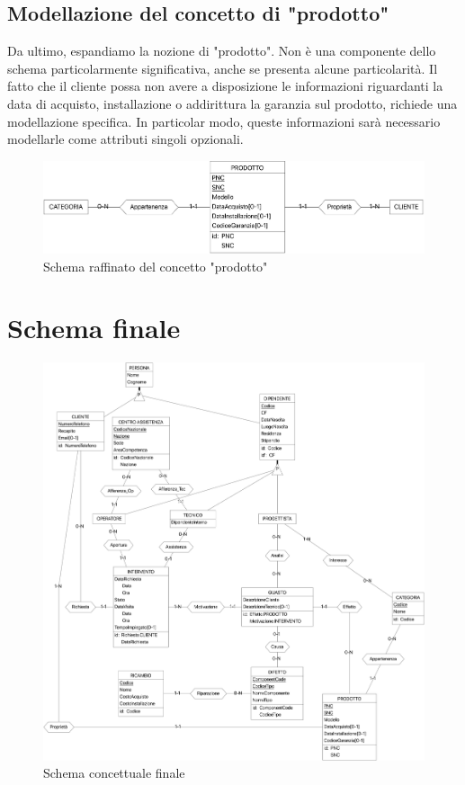 \documentclass[a4paper, 12pt]{report}
\begin{document}
\subsection{Modellazione del concetto di "prodotto"}

Da ultimo, espandiamo la nozione di "prodotto". Non è una componente dello schema particolarmente significativa, anche se presenta alcune particolarità.
Il fatto che il cliente possa non avere a disposizione le informazioni riguardanti la data di acquisto, installazione o addirittura la garanzia sul
prodotto, richiede una modellazione specifica. In particolar modo, queste informazioni sarà necessario modellarle come attributi singoli opzionali.

\begin{figure}[H]
	\centering
	\includegraphics[width=\linewidth]{images/prodotti.png}
	\caption{Schema raffinato del concetto "prodotto"}
\end{figure}

\section{Schema finale}

\begin{figure}[H]
	\centering
	\includegraphics[width=\linewidth]{images/conceptual.png}
	\caption{Schema concettuale finale}
\end{figure}
\end{document}
